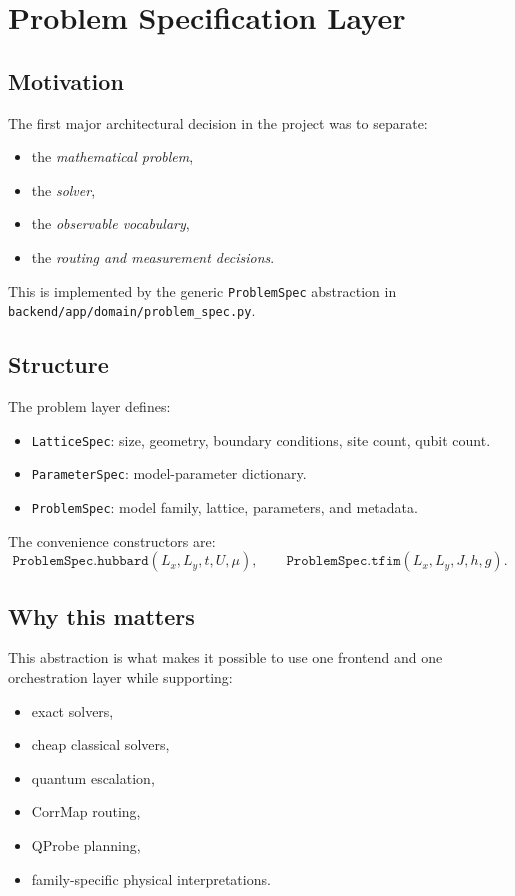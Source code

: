 \documentclass[11pt]{article}
\begin{document}
\section{Problem Specification Layer}

\subsection{Motivation}

The first major architectural decision in the project was to separate:

\begin{itemize}
\item the \emph{mathematical problem},
\item the \emph{solver},
\item the \emph{observable vocabulary},
\item the \emph{routing and measurement decisions}.
\end{itemize}

This is implemented by the generic \verb|ProblemSpec| abstraction in \verb|backend/app/domain/problem_spec.py|.

\subsection{Structure}

The problem layer defines:

\begin{itemize}
\item \verb|LatticeSpec|: size, geometry, boundary conditions, site count, qubit count.
\item \verb|ParameterSpec|: model-parameter dictionary.
\item \verb|ProblemSpec|: model family, lattice, parameters, and metadata.
\end{itemize}

The convenience constructors are:
\[
\texttt{ProblemSpec.hubbard}(L_x,L_y,t,U,\mu),
\qquad
\texttt{ProblemSpec.tfim}(L_x,L_y,J,h,g).
\]

\subsection{Why this matters}

This abstraction is what makes it possible to use one frontend and one orchestration layer while supporting:

\begin{itemize}
\item exact solvers,
\item cheap classical solvers,
\item quantum escalation,
\item CorrMap routing,
\item QProbe planning,
\item family-specific physical interpretations.
\end{itemize}
\end{document}
